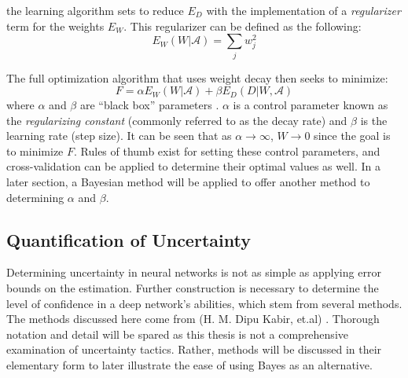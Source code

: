 
the learning algorithm sets to reduce $E_D$ with the implementation of a \textit{regularizer} term for the weights $E_W$.  This regularizer can be defined as the following:
$$
E_W(W|\mathcal{A}) = \sum_j w_j^2
$$


The full optimization algorithm that uses weight decay then seeks to minimize:
$$
F = \alpha E_W(W|\mathcal{A}) + \beta E_D(D|W,\mathcal{A})
$$
where $\alpha$ and $\beta$ are ``black box'' parameters \cite{mackay1992practical}.  $\alpha$ is a control parameter known as the \textit{regularizing constant} (commonly referred to as the decay rate) and $\beta$ is the learning rate (step size).  It can be seen that as $\alpha \rightarrow \infty$, $W \rightarrow 0$ since the goal is to minimize $F$.  Rules of thumb exist for setting these control parameters, and cross-validation can be applied to determine their optimal values as well.  In a later section, a Bayesian method will be applied to offer another method to determining $\alpha$ and $\beta$.

\subsection{Quantification of Uncertainty}

Determining uncertainty in neural networks is not as simple as applying error bounds on the estimation.  Further construction is necessary to determine the level of confidence in a deep network's abilities, which stem from several methods.  The methods discussed here come from (H. M. Dipu Kabir, et.al) \cite{8371683}.  Thorough notation and detail will be spared as this thesis is not a comprehensive examination of uncertainty tactics.  Rather, methods will be discussed in their elementary form to later illustrate the ease of using Bayes as an alternative.

